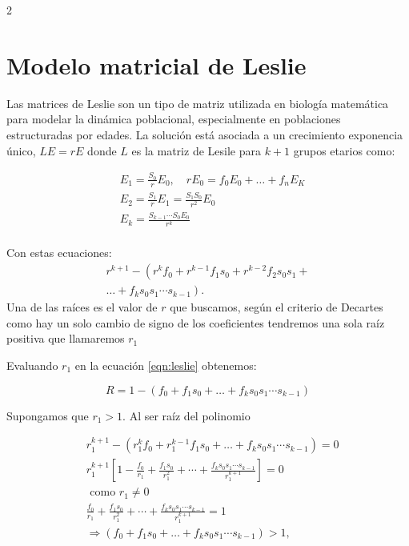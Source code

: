 \documentclass[spanish, 12pt, a4paper]{article}
\begin{document}
\begin{multicols}{2}
\section{Modelo matricial de Leslie}
Las matrices de Leslie son un tipo de matriz utilizada en biología matemática para modelar la dinámica poblacional, especialmente en poblaciones estructuradas por edades. La solución
está asociada a un crecimiento exponencia único, $L E = r E$ donde $L$ es la matriz de Lesile para $k+1$ grupos etarios como:

\begin{align*}
& E_1=\frac{S_0}{r} E_0, \quad r  E_0=f_0 E_0+\ldots+f_n E_K \\
& E_2=\frac{S_1}{r} E_1=\frac{S_1 S_0}{r^2} E_{0}\\
& E_k=\frac{S_{k-1} \cdots S_0 E_0}{r^k} \\
\end{align*}

Con estas ecuaciones:
\begin{eqnarray}
    r^{k+1} - \left( r^k f_0 + r^{k-1} f_1 s_0 + r^{k-2} f_2 s_0 s_1 + \right. \nonumber \\
    \left. \ldots + f_k s_0 s_1 \cdots s_{k-1}\right).
    \label{eqn:leslie}
\end{eqnarray}
Una de las raíces es el valor de $r$ que buscamos, según el criterio de Decartes como hay un solo cambio de signo de los coeficientes 
tendremos una sola raíz positiva que llamaremos $r_1$

Evaluando $r_1$ en la ecuación \ref{eqn:leslie} obtenemos:

$$
R=1-\left(f_0 + f_1 s_0 + \ldots + f_k s_0 s_1 \cdots s_{k-1}\right)
$$

Supongamos que $r_1 > 1$. Al ser raíz del polinomio

\begin{align*}
& r_1^{k+1}-\left(r_1^k f_0 + r_1^{k-1} f_1 s_0 + \ldots + f_k s_0 s_1 \cdots s_{k-1}\right) = 0 \\
& r_1^{k + 1}\left[1-\frac{f_0}{r_1}+\frac{f_1 s_0}{r_1^2}+\cdots+\frac{f_k s_0 s_1 \cdots s_{k-1}}{r_1^{k+1}}\right]=0 \\
& \text { como } r_1 \neq 0 \\
& \frac{f_0}{r_1}+\frac{f_1 s_0}{r_1^2}+\cdots+\frac{f_k s_0 s_1 \cdots s_{k-1}}{r_1^{k+1}}=1 \\
& \Rightarrow \left(f_0 + f_1 s_0 + \ldots + f_k s_0 s_1 \cdots s_{k-1}\right) > 1,
\end{align*}


\end{multicols}
\end{document}
